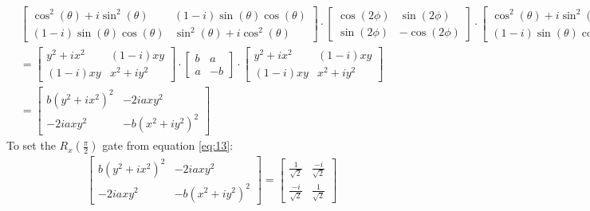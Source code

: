 \documentclass{article}
\begin{document}
	\begin{align}
			&\begin{bmatrix}
				\cos^2 (\theta) + i \sin^2 (\theta) & (1-i) \sin(\theta)\cos(\theta) \\
				(1-i) \sin(\theta)\cos(\theta) & \sin^2 (\theta) + i \cos^2(\theta)
			\end{bmatrix}
		\cdot
		\begin{bmatrix}
			\cos(2\phi) & \sin(2\phi) \\
			\sin(2\phi) & -\cos(2\phi)
		\end{bmatrix}
		\cdot
			\begin{bmatrix}
				\cos^2 (\theta) + i \sin^2 (\theta) & (1-i) \sin(\theta)\cos(\theta) \\
				(1-i) \sin(\theta)\cos(\theta) & \sin^2 (\theta) + i \cos^2(\theta)
			\end{bmatrix}\\
		&= \begin{bmatrix}
			y^2 + i x^2 & (1-i)xy \\
			(1-i)xy & x^2 + i y^2
		\end{bmatrix}
		\cdot
		\begin{bmatrix}
			b & a \\
			a & -b
		\end{bmatrix}
		\cdot
		\begin{bmatrix}
			y^2 + i x^2 & (1-i)xy \\
			(1-i)xy & x^2 + i y^2
		\end{bmatrix} \\
		&= \begin{bmatrix}
			b(y^2 + i x^2)^2 & -2iaxy^2 \\
			-2iaxy^2 & -b(x^2 + i y^2)^2
		\end{bmatrix}
		\label{eq:13}
	\end{align}
To set the \(R_x(\frac{\pi}{2})\) gate from equation \eqref{eq:13}:
\begin{align}
	&\begin{bmatrix}
			b(y^2 + i x^2)^2 & -2iaxy^2 \\
			-2iaxy^2 & -b(x^2 + i y^2)^2
		\end{bmatrix} = 
		\begin{bmatrix}
			\frac{1}{\sqrt{2}} & \frac{-i}{\sqrt{2}} \\
			\frac{-i}{\sqrt{2}} & \frac{1}{\sqrt{2}}
		\end{bmatrix}
\end{align}
\end{document}
